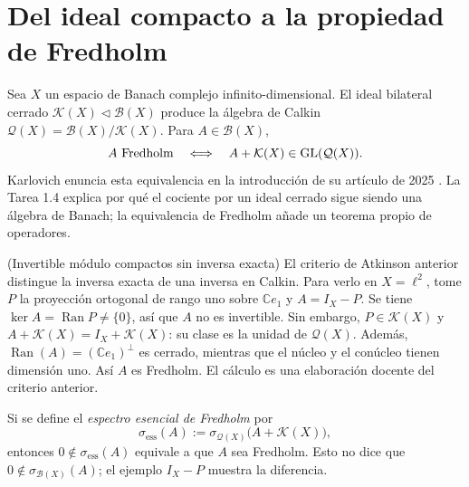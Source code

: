 \section{Del ideal compacto a la propiedad de Fredholm}

Sea $X$ un espacio de Banach complejo infinito-dimensional. El ideal bilateral cerrado
$\mathcal K(X)\triangleleft\mathcal B(X)$ produce la álgebra de Calkin
$\mathcal Q(X)=\mathcal B(X)/\mathcal K(X)$. Para $A\in\mathcal B(X)$,
\[
 A\text{ Fredholm}
 \quad\Longleftrightarrow\quad
 A+\mathcal K(X)\in\operatorname{GL}(\mathcal Q(X)).
\]
Karlovich enuncia esta equivalencia en la introducción de su artículo de 2025
\cite[p.~2]{Karlovich2025}. La Tarea 1.4 explica por qué el cociente por un ideal
cerrado sigue siendo una álgebra de Banach; la equivalencia de Fredholm añade un
teorema propio de operadores.

\begin{cthejemplo}{(Invertible módulo compactos sin inversa exacta)}
El criterio de Atkinson anterior distingue la inversa exacta de una
inversa en Calkin. Para verlo en $X=\ell^2$, tome $P$ la proyección ortogonal de rango uno sobre
$\mathbb Ce_1$ y $A=I_X-P$. Se tiene
$\ker A=\operatorname{Ran}P\ne\{0\}$, así que $A$ no es invertible. Sin embargo,
$P\in\mathcal K(X)$ y $A+\mathcal K(X)=I_X+\mathcal K(X)$: su clase es la
unidad de $\mathcal Q(X)$. Además,
$\operatorname{Ran}(A)=(\mathbb Ce_1)^\perp$ es cerrado, mientras que el núcleo
y el conúcleo tienen dimensión uno. Así $A$ es Fredholm. El cálculo es una
elaboración docente del criterio anterior.
\end{cthejemplo}

Si se define el \emph{espectro esencial de Fredholm} por
\[
 \sigma_{\mathrm{ess}}(A)
 :=\sigma_{\mathcal Q(X)}\bigl(A+\mathcal K(X)\bigr),
\]
entonces $0\notin\sigma_{\mathrm{ess}}(A)$ equivale a que $A$ sea Fredholm.
Esto no dice que $0\notin\sigma_{\mathcal B(X)}(A)$; el ejemplo $I_X-P$
muestra la diferencia.

\begin{center}
\end{center}

